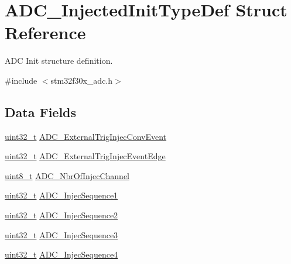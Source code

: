 \hypertarget{struct_a_d_c___injected_init_type_def}{\section{A\-D\-C\-\_\-\-Injected\-Init\-Type\-Def Struct Reference}
\label{struct_a_d_c___injected_init_type_def}
}


A\-D\-C Init structure definition.  




{\ttfamily \#include $<$stm32f30x\-\_\-adc.\-h$>$}

\subsection*{Data Fields}
\begin{DoxyCompactItemize}
\item 
\hyperlink{stdint_8h_a435d1572bf3f880d55459d9805097f62}{uint32\-\_\-t} \hyperlink{struct_a_d_c___injected_init_type_def_a6d873c4e8e1bba95fb54729c1cc29ae6}{A\-D\-C\-\_\-\-External\-Trig\-Injec\-Conv\-Event}
\item 
\hyperlink{stdint_8h_a435d1572bf3f880d55459d9805097f62}{uint32\-\_\-t} \hyperlink{struct_a_d_c___injected_init_type_def_a10ddce26a0a3fb472f779636e6ace1a7}{A\-D\-C\-\_\-\-External\-Trig\-Injec\-Event\-Edge}
\item 
\hyperlink{stdint_8h_aba7bc1797add20fe3efdf37ced1182c5}{uint8\-\_\-t} \hyperlink{struct_a_d_c___injected_init_type_def_a7850351cbc6c622318bdb7d34b4ee5c8}{A\-D\-C\-\_\-\-Nbr\-Of\-Injec\-Channel}
\item 
\hyperlink{stdint_8h_a435d1572bf3f880d55459d9805097f62}{uint32\-\_\-t} \hyperlink{struct_a_d_c___injected_init_type_def_a9db3c5a6db391effabae91b1b692a041}{A\-D\-C\-\_\-\-Injec\-Sequence1}
\item 
\hyperlink{stdint_8h_a435d1572bf3f880d55459d9805097f62}{uint32\-\_\-t} \hyperlink{struct_a_d_c___injected_init_type_def_a88cc764d85dea2c85285a2bad0c1aa3f}{A\-D\-C\-\_\-\-Injec\-Sequence2}
\item 
\hyperlink{stdint_8h_a435d1572bf3f880d55459d9805097f62}{uint32\-\_\-t} \hyperlink{struct_a_d_c___injected_init_type_def_ac03eb12e488ddd801e286244acc00327}{A\-D\-C\-\_\-\-Injec\-Sequence3}
\item 
\hyperlink{stdint_8h_a435d1572bf3f880d55459d9805097f62}{uint32\-\_\-t} \hyperlink{struct_a_d_c___injected_init_type_def_a2fe8874017f36b24f86b03cd65e6faee}{A\-D\-C\-\_\-\-Injec\-Sequence4}
\end{DoxyCompactItemize}


